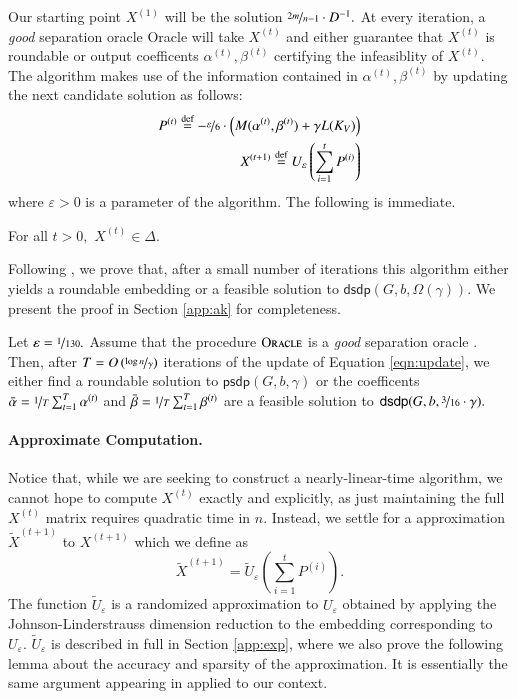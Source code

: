 \documentclass[twoside,leqno,twocolumn]{article}
\newcommand{\nfrac}{\nicefrac}
\newcommand{\defeq}{\stackrel{\textup{def}}{=}}
\newcommand{\e}{\epsilon}
\let\e\varepsilon
\numberwithin{equation}{section}
\newcommand{\psdp}{{\ensuremath{{\mathsf{psdp}}}\xspace}}
\newcommand{\dsdp}{{\ensuremath{\mathsf{dsdp}}\xspace}}
\begin{document}
Our starting point $X^{(1)}$ will be the solution $\nfrac{2m}{n-1} \cdot D^{-1}.$ 
At every iteration, a {\it good} separation oracle {\sc Oracle}\xspace will take $X^{(t)}$ and either guarantee that $X^{(t)}$ is roundable or output coefficents $\alpha^{(t)}, \beta^{(t)}$ certifying the infeasiblity of $X^{(t)}.$ The algorithm makes use of the information contained in $\alpha^{(t)}, \beta^{(t)}$ by updating the next candidate solution as follows:
\begin{align} \label{eqn:update}
P^{(t)} \defeq -\nfrac{\e}{6} \cdot \left(M(\alpha^{(t)}, \beta^{(t)}) + \gamma L(K_V)\right) \\ 
 X^{(t+1)} \defeq U_\e\left( \sum_{i=1}^t P^{(i)} \right) \notag
\end{align}
where $\e > 0$ is a parameter of the algorithm. The following is immediate.
\begin{lemma}\label{lem:delta} For all $t > 0,$ $X^{(t)} \in \Delta.$
\end{lemma}

\noindent
Following \cite{AK}, we prove that, after a small number of iterations this algorithm either yields a roundable embedding or a feasible solution to \dsdp$(G,b, \Omega(\gamma)).$
We present the proof in Section \ref{app:ak} for completeness.
\begin{theorem}\label{thm:ak}
Let $\e = \nfrac{1}{130}.$ Assume that the procedure $\textsc{Oracle}$ is a {\it good} separation oracle . Then, after $T=O\left(\nfrac{\log n}{\gamma}\right)$ iterations of the update of Equation \ref{eqn:update},  we either find a roundable solution to $\psdp(G,b,\gamma)$ or the coefficents  $\bar{\alpha} =\nfrac{1}{T} \sum_{t=1}^T  \alpha^{(t)}$ and $\bar{\beta} = \nfrac{1}{T} \sum_{t=1}^T \beta^{(t)}$ are a feasible solution to $\dsdp(G,b, \nfrac{3}{16} \cdot\gamma).$ 
\end{theorem}


\paragraph{Approximate Computation.} 
Notice that, while we are seeking to construct a nearly-linear-time algorithm, we cannot hope to compute $X^{(t)}$ exactly and explicitly, as just maintaining the full $X^{(t)}$ matrix requires quadratic time in $n.$  
Instead, we settle for a approximation $\tilde{X}^{(t+1)}$  to $X^{(t+1)}$ which we define as
$$
\tilde{X}^{(t+1)} = \tilde{U}_\e\left( \sum_{i=1}^t P^{(i)} \right).
$$
The function $\tilde{U}_\e$ is a randomized approximation to $U_\e$ obtained by applying the Johnson-Linderstrauss dimension reduction to the embedding corresponding to $U_\e.$ $\tilde{U}_\e$ is described in full in Section \ref{app:exp}, where we also prove the following lemma about the accuracy and sparsity of the approximation. It is essentially the same argument appearing in \cite{Kthesis} applied to our context.
\end{document}
